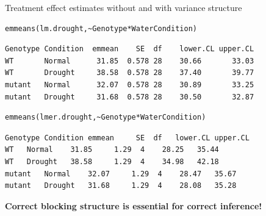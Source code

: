 \documentclass[10pt]{beamer}
\makeatletter
\newenvironment{kframe}{%
 \def\at@end@of@kframe{}%
 \ifinner\ifhmode%
  \def\at@end@of@kframe{\end{minipage}}%
  \begin{minipage}{\columnwidth}%
 \fi\fi%
 \def\FrameCommand##1{\hskip\@totalleftmargin \hskip-\fboxsep
 \colorbox{shadecolor}{##1}\hskip-\fboxsep
     \hskip-\linewidth \hskip-\@totalleftmargin \hskip\columnwidth}%
 \MakeFramed {\advance\hsize-\width
   \@totalleftmargin\z@ \linewidth\hsize
   \@setminipage}}%
 {\par\unskip\endMakeFramed%
 \at@end@of@kframe}
\newenvironment{knitrout}{}{} %
\makeatother
\begin{document}
\begin{frame}[fragile]{Treatment effect estimates without and with variance structure}
   \begin{knitrout}
 \footnotesize
{}\color{fgcolor}\begin{kframe}
\begin{verbatim}
emmeans(lm.drought,~Genotype*WaterCondition) 
\end{verbatim}
\end{kframe}
\end{knitrout}

  \begin{knitrout}
 \footnotesize
{}\color{fgcolor}\begin{kframe}
\begin{verbatim}
Genotype Condition  emmean    SE  df 	lower.CL upper.CL 
WT       Normal      31.85  0.578 28 	30.66 		33.03 
WT       Drought     38.58  0.578 28 	37.40 		39.77 
mutant   Normal      32.07  0.578 28 	30.89 		33.25 
mutant   Drought     31.68  0.578 28 	30.50 		32.87 
\end{verbatim}
\end{kframe}
\end{knitrout}


   \begin{knitrout}
 \footnotesize
{}\color{fgcolor}\begin{kframe}
\begin{verbatim}
emmeans(lmer.drought,~Genotype*WaterCondition)
\end{verbatim}
\end{kframe}
\end{knitrout}

  \begin{knitrout}
 \footnotesize
{}\color{fgcolor}\begin{kframe}
\begin{verbatim}
Genotype Condition emmean     SE  df   lower.CL upper.CL 
WT 	 Normal    31.85     1.29  4    28.25 	35.44 
WT 	 Drought   38.58     1.29  4    34.98 	42.18
mutant   Normal    32.07     1.29  4    28.47 	35.67  
mutant   Drought   31.68     1.29  4    28.08 	35.28
\end{verbatim}
\end{kframe}
\end{knitrout}

 \textbf{Correct blocking structure is essential for correct inference!}
\end{frame}
\end{document}

